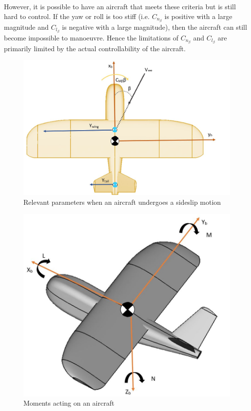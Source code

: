 However, it is possible to have an aircraft that meets these criteria but is still hard to control. If the yaw or roll is too stiff (i.e. $C_{n_\beta}$ is positive with a large magnitude and $C_{l_\beta}$ is negative with a large magnitude), then the aircraft can still become impossible to manoeuvre. Hence the limitations of $C_{n_\beta}$ and $C_{l_\beta}$ are primarily limited by the actual controllability of the aircraft. 




\begin{figure}[H]
  \centering
   \includegraphics[width=0.8\linewidth]{03_LiteratureReview/Figs/sideslip.JPG}
  \caption{Relevant parameters when an aircraft undergoes a sideslip motion}
  \label{fig:sideslip}
\end{figure}

\begin{figure}[H]
  \centering
   \includegraphics[width=0.8\linewidth]{03_LiteratureReview/Figs/axes2.JPG}
  \caption{Moments acting on an aircraft}
  \label{fig:pitch}
\end{figure}




